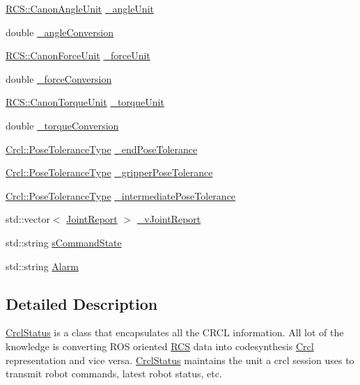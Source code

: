 \begin{DoxyCompactItemize}
\item 
\hyperlink{namespaceRCS_ad07ee9a15612cae458796cf946e36410}{R\-C\-S\-::\-Canon\-Angle\-Unit} \hyperlink{structCrcl_1_1CrclStatus_a089adf5239cb75e9bd966d94da2f9b18}{\-\_\-angle\-Unit}
\item 
double \hyperlink{structCrcl_1_1CrclStatus_a107704fe77ba28d4d4d7e6646160df86}{\-\_\-angle\-Conversion}
\item 
\hyperlink{namespaceRCS_a7ab3ac05af337215785442dc8570c00f}{R\-C\-S\-::\-Canon\-Force\-Unit} \hyperlink{structCrcl_1_1CrclStatus_a4c189e961e876682b51f2c2e12aa032a}{\-\_\-force\-Unit}
\item 
double \hyperlink{structCrcl_1_1CrclStatus_ae7fa1a8cf85b8c0968d747dd2b4d8b89}{\-\_\-force\-Conversion}
\item 
\hyperlink{namespaceRCS_aad43ee626dc2b93364a9276cd0190b38}{R\-C\-S\-::\-Canon\-Torque\-Unit} \hyperlink{structCrcl_1_1CrclStatus_a51082e4b4a5fa27a8244d1ea77a9fd40}{\-\_\-torque\-Unit}
\item 
double \hyperlink{structCrcl_1_1CrclStatus_a1dcd8215508cb4af98b647a0b8c2bf98}{\-\_\-torque\-Conversion}
\item 
\hyperlink{namespaceCrcl_ac805071e16341b82d4fa4e12b7f3ac6f}{Crcl\-::\-Pose\-Tolerance\-Type} \hyperlink{structCrcl_1_1CrclStatus_a3329553459fd87df256119326cfd703e}{\-\_\-end\-Pose\-Tolerance}
\item 
\hyperlink{namespaceCrcl_ac805071e16341b82d4fa4e12b7f3ac6f}{Crcl\-::\-Pose\-Tolerance\-Type} \hyperlink{structCrcl_1_1CrclStatus_a6e3526617c935d84b1f3d9c4ec9133a0}{\-\_\-gripper\-Pose\-Tolerance}
\item 
\hyperlink{namespaceCrcl_ac805071e16341b82d4fa4e12b7f3ac6f}{Crcl\-::\-Pose\-Tolerance\-Type} \hyperlink{structCrcl_1_1CrclStatus_a40458b87a045e9a1ef630334037f37cd}{\-\_\-intermediate\-Pose\-Tolerance}
\item 
std\-::vector$<$ \hyperlink{structCrcl_1_1JointReport}{Joint\-Report} $>$ \hyperlink{structCrcl_1_1CrclStatus_aa26e119cf006f7f9c0da64aa4944fc1f}{\-\_\-v\-Joint\-Report}
\item 
std\-::string \hyperlink{structCrcl_1_1CrclStatus_af485e1524d7eb0f8108fabeb9ae371f8}{s\-Command\-State}
\item 
std\-::string \hyperlink{structCrcl_1_1CrclStatus_a0cd3ee396ed753479bd03ec30809db22}{Alarm}
\end{DoxyCompactItemize}


\subsection{Detailed Description}
\hyperlink{structCrcl_1_1CrclStatus}{Crcl\-Status} is a class that encapsulates all the C\-R\-C\-L information. All lot of the knowledge is converting R\-O\-S oriented \hyperlink{namespaceRCS}{R\-C\-S} data into codesynthesis \hyperlink{namespaceCrcl}{Crcl} representation and vice versa. \hyperlink{structCrcl_1_1CrclStatus}{Crcl\-Status} maintains the unit a crcl session uses to transmit robot commands, latest robot status, etc. 

